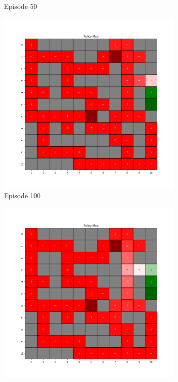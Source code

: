 \documentclass{assignment}
\begin{document}
\begin{figure}[H]
\begin{subfigure}{0.3\textwidth}
    \caption{Episode 50}
    \end{subfigure}\hfill
    \begin{subfigure}{0.3\textwidth}
        \includegraphics[width=\textwidth]{figures/policy_q/gamma_sweep/policy_alpha_0.1_gamma_0.75_epsilon_0.2_iteration_100.png}
    \caption{Episode 100}
    \end{subfigure}
    \begin{subfigure}{0.3\textwidth}
        \includegraphics[width=\textwidth]{figures/policy_q/gamma_sweep/policy_alpha_0.1_gamma_0.75_epsilon_0.2_iteration_1000.png}

\end{subfigure}
\end{figure}
\end{document}
